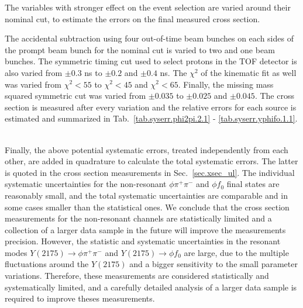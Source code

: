 The variables with stronger effect on the event selection are varied around their nominal cut, to estimate the errors on the final measured cross section.
\par The accidental subtraction using four out-of-time beam bunches on each sides of the prompt beam bunch for the nominal cut is varied to two and one beam bunches. The symmetric timing cut used to select protons in the TOF detector is also varied from $\pm 0.3$ ns to $\pm 0.2$ and $\pm 0.4$ ns. The $\chi^2$ of the kinematic fit as well was varied from $\chi^{2}<55$ to $\chi^{2}<45$ and $\chi^{2}<65$. Finally, the missing mass squared symmetric cut was varied from $\pm 0.035$ to $\pm 0.025$ and $\pm 0.045$. The cross section is measured after every variation and the relative errors for each source is estimated and summarized in Tab.~\ref{tab.syserr.phi2pi.2.1} - \ref{tab.syserr.yphifo.1.1}.\\
~\par Finally, the above potential systematic errors, treated independently from each other, are added in quadrature to calculate the total systematic errors. The latter is quoted in the cross section measurements in Sec.~\ref{sec.xsec_ul}. The individual systematic uncertainties for the non-resonant $\phi \pi^{+} \pi^{-}$ and $\phi f_0$ final states are reasonably small, and the total systematic uncertainties are comparable and in some cases smaller than the statistical ones. We conclude that the cross section measurements for the non-resonant channels are statistically limited and a collection of a larger data sample in the future will improve the measurements precision. However, the statistic and systematic uncertainties in the resonant modes $Y(2175) \rightarrow \phi \pi^{+} \pi^{-}$ and $Y(2175) \rightarrow \phi f_0$ are large, due to the multiple fluctuations around the $Y(2175)$ and a bigger sensitivity to the small parameter variations. Therefore, these measurements are considered statistically and systematically limited, and a carefully detailed analysis of a larger data sample is required to improve theses measurements.

\newpage

